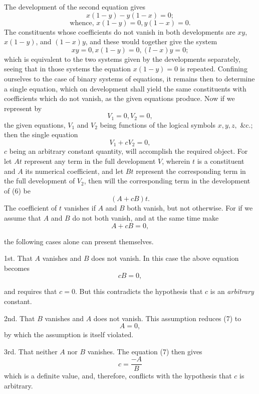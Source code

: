 \documentclass[oneside]{book}
\begin{document}
The development of the second equation gives
\[
x(1-y)-y(1 -x) = 0;
\]
\begin{equation}
\textrm{whence, }x (1 - y) = 0, y (1 - x) = 0.
\end{equation}
The constituents whose coefficients do not vanish in both developments
are $xy$, $x (1 - y)$, and $(1 - x) y$, and these would together
give the system
\begin{equation}
xy = 0, x(1-y) = 0, (l-x)y=0;
\end{equation}
which is equivalent to the two systems given by the developments
separately, seeing that in those systems the equation $x (1 - y) = 0$
is repeated. Confining ourselves to the case of binary systems
of equations, it remains then to determine a single equation,
which on development shall yield the same constituents with
coefficients which do not vanish, as the given equations produce.
Now if we represent by
\[
V_1 = 0, V_2 = 0,
\]
the given equations, $V_1$ and $V_2$ being functions of the logical symbols
$x, y, z,$ \&c.; then the single equation
\begin{equation}
V_1 +cV_2=0,
\end{equation}
$c$ being an arbitrary constant quantity, will accomplish the required object. For let $At$ represent any term in the full development $V$, wherein $t$ is a constituent and $A$ its numerical
coefficient, and let $Bt$ represent the corresponding term in the
full development of $V_2$, then will the corresponding term in the
development of (6) be
\[
(A + cB) t.
\]
The coefficient of $t$ vanishes if $A$ and $B$ both vanish, but not
otherwise. For if we assume that $A$ and $B$ do not both vanish,
and at the same time make
\begin{equation}
A + cB = 0,
\end{equation}

the following cases alone can present themselves.

1st. That $A$ vanishes and $B$ does not vanish. In this case
the above equation becomes
\[
cB = 0,
\]

and requires that $c = 0$. But this contradicts the hypothesis that
$c$ is an \textit{arbitrary} constant.

2nd. That $B$ vanishes and $A$ does not vanish. This assumption reduces (7) to
\[
A = 0,
\]
by which the assumption is itself violated.

3rd. That neither $A$ nor $B$ vanishes. The equation (7) then
gives
\[
    c = \frac{-A}{B}
\]
which is a definite value, and, therefore, conflicts with the hypothesis
that $c$ is arbitrary.
\end{document}
